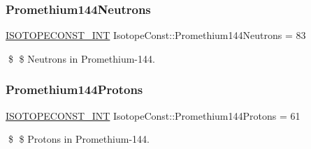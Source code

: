\subsubsection{\texorpdfstring{Promethium144\+Neutrons}{Promethium144Neutrons}}
{\footnotesize\ttfamily \mbox{\hyperlink{group___isotope_const-_macros_ga5f18360b3e99483a35c32d789e62621c}{I\+S\+O\+T\+O\+P\+E\+C\+O\+N\+S\+T\+\_\+\+I\+NT}} Isotope\+Const\+::\+Promethium144\+Neutrons = 83}

\$ \$ Neutrons in Promethium-\/144. \mbox{\label{group___isotope_const-_promethium-_pm144_gaf39f6b301b31b4c514e0093d0c682f56}} 
\subsubsection{\texorpdfstring{Promethium144\+Protons}{Promethium144Protons}}
{\footnotesize\ttfamily \mbox{\hyperlink{group___isotope_const-_macros_ga5f18360b3e99483a35c32d789e62621c}{I\+S\+O\+T\+O\+P\+E\+C\+O\+N\+S\+T\+\_\+\+I\+NT}} Isotope\+Const\+::\+Promethium144\+Protons = 61}

\$ \$ Protons in Promethium-\/144. 